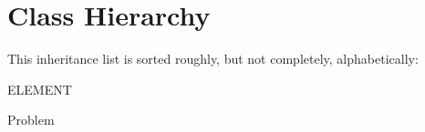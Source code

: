 \section{Class Hierarchy}
This inheritance list is sorted roughly, but not completely, alphabetically\+:\begin{DoxyCompactList}
\item E\+L\+E\+M\+E\+NT\begin{DoxyCompactList}
\item {}
\end{DoxyCompactList}
\item Problem\begin{DoxyCompactList}
\item {}
\end{DoxyCompactList}
\end{DoxyCompactList}
